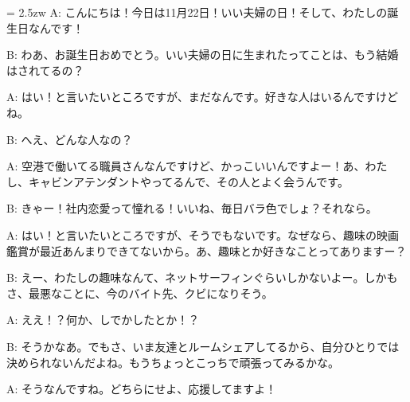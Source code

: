 \documentclass[11pt]{amsart}
\title{}
\author{}
\newenvironment{hangall}[1]{\hangindent = 2.5zw\everypar{\hangindent = 2.5zw}}{}
\begin{document}
\maketitle
\begin{hangall}{}%
A: こんにちは！今日は11月22日！いい夫婦の日！そして、わたしの誕生日なんです！



B: わあ、お誕生日おめでとう。いい夫婦の日に生まれたってことは、もう結婚はされてるの？



A: はい！と言いたいところですが、まだなんです。好きな人はいるんですけどね。



B: へえ、どんな人なの？



A: 空港で働いてる職員さんなんですけど、かっこいいんですよー！あ、わたし、キャビンアテンダントやってるんで、その人とよく会うんです。



B: きゃー！社内恋愛って憧れる！いいね、毎日バラ色でしょ？それなら。



A: はい！と言いたいところですが、そうでもないです。なぜなら、趣味の映画鑑賞が最近あんまりできてないから。あ、趣味とか好きなことってありますー？



B: えー、わたしの趣味なんて、ネットサーフィンぐらいしかないよー。しかもさ、最悪なことに、今のバイト先、クビになりそう。



A: ええ！？何か、しでかしたとか！？



B: そうかなあ。でもさ、いま友達とルームシェアしてるから、自分ひとりでは決められないんだよね。もうちょっとこっちで頑張ってみるかな。



A: そうなんですね。どちらにせよ、応援してますよ！\end{hangall}
\end{document}
